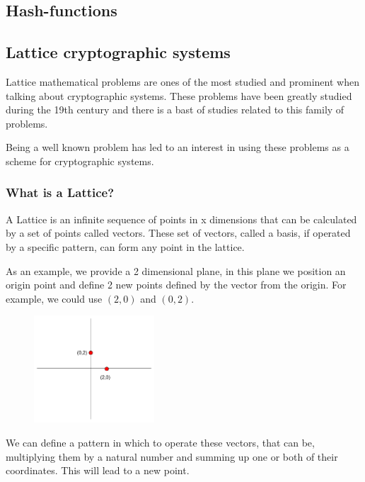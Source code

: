 \pagebreak
\subsection{ Hash-functions }


\pagebreak
\subsection{ Lattice cryptographic systems }

Lattice mathematical problems are ones of the most studied and prominent when
talking about cryptographic systems. These problems have been greatly studied
during the 19th century and there is a bast of studies related to this family of
problems.

Being a well known problem has led to an interest in using these problems as a
scheme for cryptographic systems.

\subsubsection{ What is a Lattice?  }

A Lattice is an infinite sequence of points in x dimensions that can be
calculated by a set of points called vectors. These set of vectors, called a
basis, if operated by a specific pattern, can form any point in the lattice.

As an example, we provide a 2 dimensional plane, in this plane we position an
origin point and define 2 new points defined by the vector from the origin. For
example, we could use $(2,0)$ and $(0,2)$.

\begin{figure}[H]
    \centering
    \includegraphics[width=0.4\textwidth]{images/lattice0}
\end{figure}

We can define a pattern in which to operate these vectors, that can be,
multiplying them by a natural number and summing up one or both of their
coordinates. This will lead to a new point.

